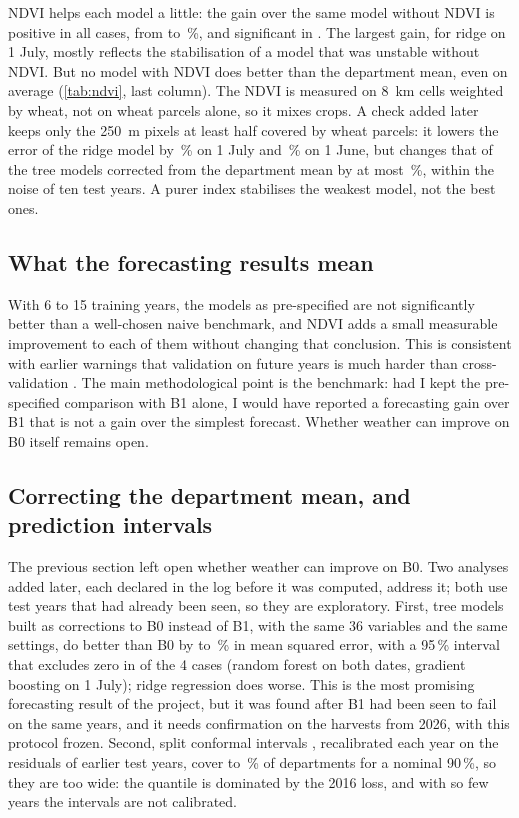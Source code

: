 NDVI helps each model a little: the gain over the same model without NDVI is positive in all \NdviTot{} cases, from \NdviGainMin{} to \NdviGainMax\,\%, and significant in \NdviSig. The largest gain, for ridge on 1 July, mostly reflects the stabilisation of a model that was unstable without NDVI. But no model with NDVI does better than the department mean, even on average (\cref{tab:ndvi}, last column). The NDVI is measured on 8~km cells weighted by wheat, not on wheat parcels alone, so it mixes crops. A check added later keeps only the 250~m pixels at least half covered by wheat parcels: it lowers the error of the ridge model by \PureRidgeJuly\,\% on 1 July and \PureRidgeJune\,\% on 1 June, but changes that of the tree models corrected from the department mean by at most \PureBzeroAbs\,\%, within the noise of ten test years. A purer index stabilises the weakest model, not the best ones.

\subsection{What the forecasting results mean}

With 6 to 15 training years, the models as pre-specified are not significantly better than a well-chosen naive benchmark, and NDVI adds a small measurable improvement to each of them without changing that conclusion. This is consistent with earlier warnings that validation on future years is much harder than cross-validation \parencite{gouache2015,morales2023}. The main methodological point is the benchmark: had I kept the pre-specified comparison with B1 alone, I would have reported a forecasting gain over B1 that is not a gain over the simplest forecast. Whether weather can improve on B0 itself remains open.

\subsection{Correcting the department mean, and prediction intervals}
\label{subsec:forecast-v12}

The previous section left open whether weather can improve on B0. Two analyses added later, each declared in the log before it was computed, address it; both use test years that had already been seen, so they are exploratory. First, tree models built as corrections to B0 instead of B1, with the same 36 variables and the same settings, do better than B0 by \BzeroTreeMin{} to \BzeroTreeMax\,\% in mean squared error, with a 95\,\% interval that excludes zero in \BzeroTreeSig{} of the 4 cases (random forest on both dates, gradient boosting on 1 July); ridge regression does worse. This is the most promising forecasting result of the project, but it was found after B1 had been seen to fail on the same years, and it needs confirmation on the harvests from 2026, with this protocol frozen. Second, split conformal intervals \parencite{lei2018}, recalibrated each year on the residuals of earlier test years, cover \ConfCovMin{} to \ConfCovMax\,\% of departments for a nominal 90\,\%, so they are too wide: the quantile is dominated by the 2016 loss, and with so few years the intervals are not calibrated.
